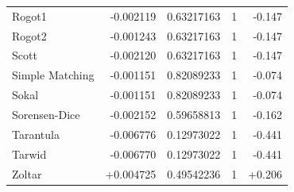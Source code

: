 \begin{longtable}{lrrrr}
Rogot1 & -0.002119 & 0.63217163 & 1 & -0.147 \\
Rogot2 & -0.001243 & 0.63217163 & 1 & -0.147 \\
Scott & -0.002120 & 0.63217163 & 1 & -0.147 \\
Simple Matching & -0.001151 & 0.82089233 & 1 & -0.074 \\
Sokal & -0.001151 & 0.82089233 & 1 & -0.074 \\
Sorensen-Dice & -0.002152 & 0.59658813 & 1 & -0.162 \\
Tarantula & -0.006776 & 0.12973022 & 1 & -0.441 \\
Tarwid & -0.006770 & 0.12973022 & 1 & -0.441 \\
Zoltar & +0.004725 & 0.49542236 & 1 & +0.206 \\
\bottomrule
\end{longtable}
